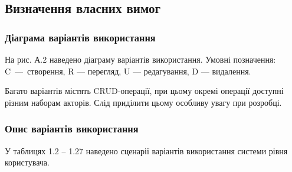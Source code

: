 \subsection{Визначення власних вимог}
\subsubsection{Діаграма варіантів використання}
\bigbreak
На рис. А.2 наведено діаграму варіантів використання. Умовні позначення: C~---~створення, R --- перегляд, U --- редагування, D --- видалення.

Багато варіантів містять CRUD-операції, при цьому окремі операції доступні різним наборам акторів. Слід приділити цьому особливу увагу при розробці.
\bigbreak
\subsubsection{Опис варіантів використання}
\bigbreak
У таблицях 1.2 -- 1.27 наведено сценарії варіантів використання системи рівня користувача.

\newcommand{\rowspan}[2]{
 \multirow{1}{*}[
  \dimexpr#1 / 2\relax
 ]{#2}
}

\newlength{\spanHeight}
\newbox\tmpparbox


